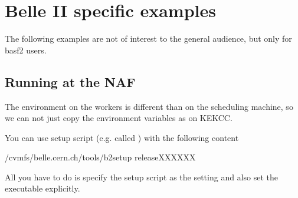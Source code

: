 \documentclass[letterpaper,10pt,english]{sphinxmanual}
\begin{document}
\section{Belle II specific examples}
\label{\detokenize{advanced/basf2-examples:belle-ii-specific-examples}}\label{\detokenize{advanced/basf2-examples:basf2-example-label}}\label{\detokenize{advanced/basf2-examples::doc}}
The following examples are not of interest to the general audience, but only for basf2 users.


\subsection{Running at the NAF}
\label{\detokenize{advanced/basf2-examples:running-at-the-naf}}
The environment on the workers is different than on the scheduling machine, so we can not
just copy the environment variables as on KEKCC.

You can use setup script (e.g. called ) with the following content

\begin{sphinxVerbatim}[commandchars=\\\{\}]
 /cvmfs/belle.cern.ch/tools/b2setup release\PYGZhy{}XX\PYGZhy{}XX\PYGZhy{}XX
\end{sphinxVerbatim}

All you have to do is specify the setup script as the  setting and also set the
executable explicitly.
\end{document}
